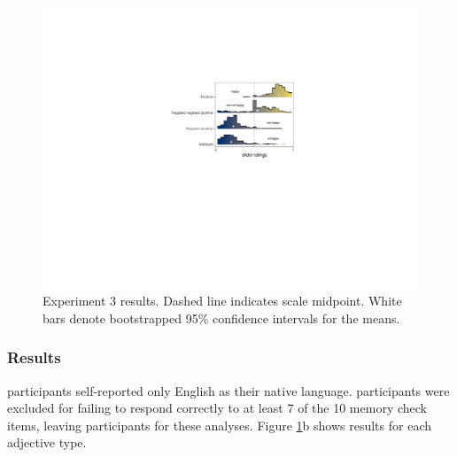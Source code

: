 \documentclass[floatsintext,doc]{apa6}
\begin{document}
\begin{figure}[h]
\centering \includegraphics[width=0.75\linewidth]{figs/expt3_directlabel_hist} 
\caption{Experiment 3 results. Dashed line indicates scale midpoint. White bars denote bootstrapped 95\% confidence intervals for the means.}\label{fig:expt3-results}
\end{figure}


\subsubsection{Results}

 participants self-reported only English as their native language. 
 participants were excluded for failing to respond correctly to at least 7 of the 10 memory check items, leaving  participants for these analyses.
Figure \ref{fig:expt3-results}b shows results for each adjective type.
\end{document}
